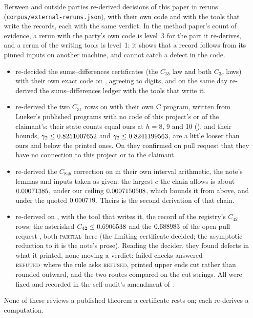 \documentclass[preprint,11pt,authoryear,a4paper]{elsarticle}
\newcommand{\vword}[1]{{\normalfont\scshape #1}}
\newcommand{\vR}{\vword{refuted}}
\newcommand{\vF}{\vword{refused}}
\newcommand{\vP}{\vword{partial}}
\begin{document}
Between \OcOutFirst{} and \OcOutLast{} \OcOutParties{} outside parties re-derived decisions of this paper in \OcOutRuns{} reruns (\texttt{corpus/external-reruns.json}), \OcOutOwn{} with their own code and \OcOutTools{} with the tools that write the records, each with the same verdict. In the method paper's count of evidence, a rerun with the party's own code is level~3 for the part it re-derives, and a rerun of the writing tools is level~1: it shows that a record follows from its pinned inputs on another machine, and cannot catch a defect in the code.
\begin{itemize}\setlength{\itemsep}{1pt}
\item \OcOutSdWho{} re-decided the \OcOutSdRows{} sums--differences certificates (the $C_{3b}$ law and both $C_{3c}$ laws) with their own exact code on \OcOutSdDate, agreeing to \OcOutSdDigits{} digits, and on the same day re-derived the sums--differences ledger with the tools that write it.
\item \OcOutLuWho{} re-derived the two $C_{31}$ rows on \OcOutLuDate{} with their own C program, written from Lueker's published programs with no code of this project's or of the claimant's: their state counts equal ours at $h = 8$, 9 and 10 (\OcOutLuStates), and their bounds, $\gamma_2 \le 0.8251007652$ and $\gamma_2 \le 0.8241199563$, are a little looser than ours and below the printed ones. On \OcOutLuIndependent{} they confirmed on pull request \OcLuOurPr{} that they have no connection to this project or to the claimant.
\item \OcOutSpWho{} re-derived the $C_{84b}$ correction on \OcOutSpDate{} in their own interval arithmetic, the note's lemmas and inputs taken as given: the largest $c$ the chain allows is about $0.00071385$, under our ceiling $0.0007150508$, which bounds it from above, and under the quoted $0.000719$. Theirs is the second derivation of that chain.
\item \OcOutTuWho{} re-derived on \OcOutTuDate, with the tool that writes it, the record of the registry's $C_{42}$ rows: the asterisked $C_{42} \le 0.6906538$ and the $0.688983$ of the open pull request \OcTuPr, both \vP\ here (the limiting certificate decided; the asymptotic reduction to it is the note's prose). Reading the decider, they found \OcOutTuDefects{} defects in what it printed, none moving a verdict: failed checks answered \vR\ where the rule asks \vF, printed upper ends cut rather than rounded outward, and the two routes compared on the cut strings. All were fixed and recorded in the self-audit's amendment of \OcOutTuAmended.
\end{itemize}
None of these reviews a published theorem a certificate rests on; each re-derives a computation.
\end{document}

